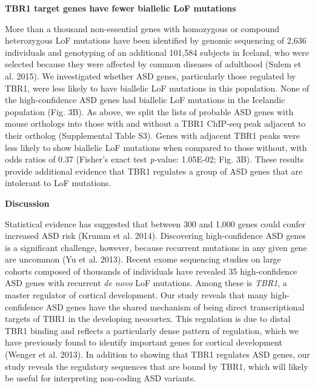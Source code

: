 \documentclass[]{article}
\begin{document}
\textbf{TBR1 target genes have fewer biallelic LoF mutations}

More than a thousand non-essential genes with homozygous or compound
heterozygous LoF mutations have been identified by genomic sequencing of
2,636 individuals and genotyping of an additional 101,584 subjects in
Iceland, who were selected because they were affected by common diseases
of adulthood (Sulem et al. 2015). We investigated whether ASD genes,
particularly those regulated by TBR1, were less likely to have biallelic
LoF mutations in this population. None of the high-confidence ASD genes
had biallelic LoF mutations in the Icelandic population (Fig. 3B). As
above, we split the lists of probable ASD genes with mouse orthologs
into those with and without a TBR1 ChIP-seq peak adjacent to their
ortholog (Supplemental Table S3). Genes with adjacent TBR1 peaks were
less likely to show biallelic LoF mutations when compared to those
without, with odds ratios of 0.37 (Fisher's exact test \emph{p-}value:
1.05E-02; Fig. 3B). These results provide additional evidence that TBR1
regulates a group of ASD genes that are intolerant to LoF mutations.

\textbf{Discussion}

Statistical evidence has suggested that between 300 and 1,000 genes
could confer increased ASD risk (Krumm et al. 2014). Discovering
high-confidence ASD genes is a significant challenge, however, because
recurrent mutations in any given gene are uncommon (Yu et al. 2013).
Recent exome sequencing studies on large cohorts composed of thousands
of individuals have revealed 35 high-confidence ASD genes with recurrent
\emph{de novo} LoF mutations. Among these is \emph{TBR1}, a master
regulator of cortical development. Our study reveals that many
high-confidence ASD genes have the shared mechanism of being direct
transcriptional targets of TBR1 in the developing neocortex. This
regulation is due to distal TBR1 binding and reflects a particularly
dense pattern of regulation, which we have previously found to identify
important genes for cortical development (Wenger et al. 2013). In
addition to showing that TBR1 regulates ASD genes, our study reveals the
regulatory sequences that are bound by TBR1, which will likely be useful
for interpreting non-coding ASD variants.
\end{document}
